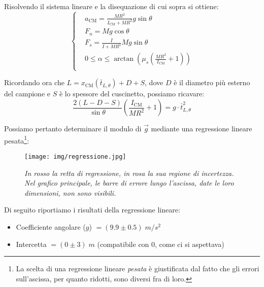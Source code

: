 \documentclass{article}
\begin{document}
Risolvendo il sistema lineare e la disequazione di cui sopra si ottiene:
\[\left\{\begin{aligned}
    &a_\text{CM} = \frac{M R^2}{I_\text{CM} + M R^2} g\sin\theta \\
    &F_n = M g \cos\theta \\
    &F_s = \frac{I}{I + M R^2} M g \sin\theta \\
    & 0 \le \alpha \le \arctan\left(\mu_s \left(\frac{MR^2}{I_\text{CM}} + 1\right)\right) \\
\end{aligned}\right.\]

Ricordando ora che $L = x_\text{CM}(\bar{t}_{L,\theta}) + D + S$, dove $D$ è il diametro
più esterno del campione e $S$ è lo spessore del cuscinetto, possiamo ricavare:
\[
    \frac{2(L-D-S)}{\sin\theta}\left(\frac{I_\text{CM}}{M R^2} + 1\right) = g \cdot \bar{t}_{L,\theta}^2
\]

Possiamo pertanto determinare il modulo di $\vec{g}$ mediante una regressione
lineare pesata\footnote{
    La scelta di una regressione lineare \emph{pesata} è giustificata dal fatto
    che gli errori sull'ascissa, per quanto ridotti, sono diversi fra di loro.
}:
\begin{figure}[H]
    \texttt{[image: img/regressione.jpg]}
    \caption*{\emph{
        In rosso la retta di regressione, in rosa la sua regione di incertezza. \\
        Nel grafico principale, le barre di errore lungo l'ascissa, date le loro
        dimensioni, non sono visibili.
    }}
\end{figure}

Di seguito riportiamo i risultati della regressione lineare:
\begin{itemize}
    \item Coefficiente angolare ($g$) $=(9.9\pm0.5)\;\unit{m \per s^2}$
    \item Intercetta $=(0\pm3)\;\unit{m}$ (compatibile con $0$, come ci si aspettava)
\end{itemize}
\end{document}

